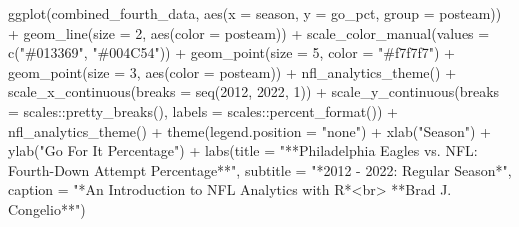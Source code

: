 \documentclass[
  letterpaper,
]{krantz}
\newenvironment{Shaded}{\begin{snugshade}}{\end{snugshade}}
\newcommand{\AttributeTok}[1]{\textcolor[rgb]{0.40,0.45,0.13}{#1}}
\newcommand{\DecValTok}[1]{\textcolor[rgb]{0.68,0.00,0.00}{#1}}
\newcommand{\FunctionTok}[1]{\textcolor[rgb]{0.28,0.35,0.67}{#1}}
\newcommand{\NormalTok}[1]{\textcolor[rgb]{0.00,0.23,0.31}{#1}}
\newcommand{\SpecialCharTok}[1]{\textcolor[rgb]{0.37,0.37,0.37}{#1}}
\newcommand{\StringTok}[1]{\textcolor[rgb]{0.13,0.47,0.30}{#1}}
\begin{document}
\begin{Shaded}
\begin{Highlighting}[]
\FunctionTok{ggplot}\NormalTok{(combined\_fourth\_data, }\FunctionTok{aes}\NormalTok{(}\AttributeTok{x =}\NormalTok{ season,}
                                 \AttributeTok{y =}\NormalTok{ go\_pct,}
                                 \AttributeTok{group =}\NormalTok{ posteam)) }\SpecialCharTok{+}
  \FunctionTok{geom\_line}\NormalTok{(}\AttributeTok{size =} \DecValTok{2}\NormalTok{, }\FunctionTok{aes}\NormalTok{(}\AttributeTok{color =}\NormalTok{ posteam)) }\SpecialCharTok{+}
  \FunctionTok{scale\_color\_manual}\NormalTok{(}\AttributeTok{values =} \FunctionTok{c}\NormalTok{(}\StringTok{"\#013369"}\NormalTok{, }\StringTok{"\#004C54"}\NormalTok{)) }\SpecialCharTok{+}
  \FunctionTok{geom\_point}\NormalTok{(}\AttributeTok{size =} \DecValTok{5}\NormalTok{, }\AttributeTok{color =} \StringTok{"\#f7f7f7"}\NormalTok{) }\SpecialCharTok{+}
  \FunctionTok{geom\_point}\NormalTok{(}\AttributeTok{size =} \DecValTok{3}\NormalTok{, }\FunctionTok{aes}\NormalTok{(}\AttributeTok{color =}\NormalTok{ posteam)) }\SpecialCharTok{+}
  \FunctionTok{nfl\_analytics\_theme}\NormalTok{() }\SpecialCharTok{+}
  \FunctionTok{scale\_x\_continuous}\NormalTok{(}\AttributeTok{breaks =} \FunctionTok{seq}\NormalTok{(}\DecValTok{2012}\NormalTok{, }\DecValTok{2022}\NormalTok{, }\DecValTok{1}\NormalTok{)) }\SpecialCharTok{+}
  \FunctionTok{scale\_y\_continuous}\NormalTok{(}\AttributeTok{breaks =}\NormalTok{ scales}\SpecialCharTok{::}\FunctionTok{pretty\_breaks}\NormalTok{(),}
                     \AttributeTok{labels =}\NormalTok{ scales}\SpecialCharTok{::}\FunctionTok{percent\_format}\NormalTok{()) }\SpecialCharTok{+}
  \FunctionTok{nfl\_analytics\_theme}\NormalTok{() }\SpecialCharTok{+}
  \FunctionTok{theme}\NormalTok{(}\AttributeTok{legend.position =} \StringTok{"none"}\NormalTok{) }\SpecialCharTok{+}
  \FunctionTok{xlab}\NormalTok{(}\StringTok{"Season"}\NormalTok{) }\SpecialCharTok{+}
  \FunctionTok{ylab}\NormalTok{(}\StringTok{"Go For It Percentage"}\NormalTok{) }\SpecialCharTok{+}
  \FunctionTok{labs}\NormalTok{(}\AttributeTok{title =} \StringTok{"**Philadelphia Eagles vs. NFL: Fourth{-}Down Attempt Percentage**"}\NormalTok{,}
       \AttributeTok{subtitle =} \StringTok{"*2012 {-} 2022: Regular Season*"}\NormalTok{,}
       \AttributeTok{caption =} \StringTok{"*An Introduction to NFL Analytics with R*\textless{}br\textgreater{}}
\StringTok{       **Brad J. Congelio**"}\NormalTok{)}
\end{Highlighting}
\end{Shaded}
\end{document}

